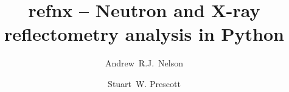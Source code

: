 \documentclass[pdf,preprint]{article}
\begin{document}
\title{refnx -- Neutron and X-ray reflectometry analysis in Python}

\author[1]{Andrew~R.J.~Nelson}
\author[2]{Stuart~W. Prescott}

\newcommand{\refnx}{\emph{refnx}}
\newcommand{\Objective}{\texttt{Objective}}
\newcommand{\GlobalObjective}{\texttt{GlobalObjective}}
\newcommand{\Parameter}{\texttt{Parameter}}
\newcommand{\Structure}{\texttt{Structure}}
\newcommand{\Slab}{\texttt{Slab}}
\newcommand{\Component}{\texttt{Component}}
\newcommand{\LipidLeaflet}{\texttt{LipidLeaflet}}
\newcommand{\Transform}{\texttt{Transform}}
\newcommand{\DataD}{\texttt{Data1D}}
\newcommand{\ReflectModel}{\texttt{ReflectModel}}
\newcommand{\CurveFitter}{\texttt{CurveFitter}}
\newcommand{\Spline}{\texttt{Spline}}
\newcommand{\conda}{\emph{conda}}
\newcommand{\corner}{\emph{corner}}
\newcommand{\MixedReflectModel}{\texttt{MixedReflectModel}}
\newcommand{\pip}{\emph{pip}}
\newcommand{\emcee}{\emph{emcee}}
\newcommand{\ptemcee}{\emph{ptemcee}}
\newcommand{\NumPy}{\emph{NumPy}}
\newcommand{\SciPy}{\emph{SciPy}}
\newcommand{\Cython}{\emph{Cython}}
\newcommand{\Jupyter}{\emph{Jupyter}}
\newcommand{\ipywidgets}{\emph{ipywidgets}}

\maketitle


\end{document}

